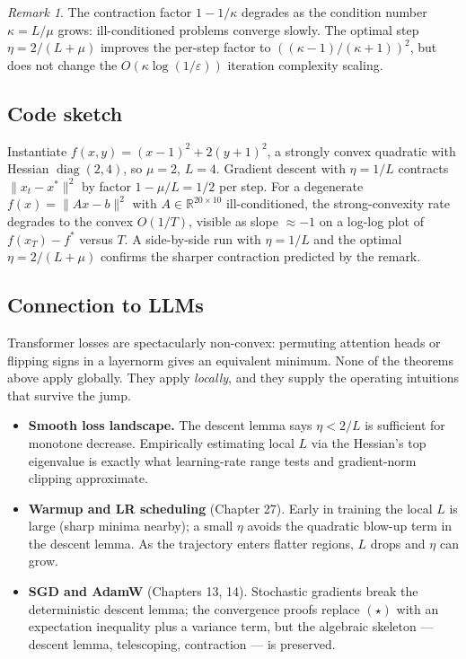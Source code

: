 \documentclass[11pt]{article}
\theoremstyle{remark}
\newtheorem{remark}[theorem]{Remark}
\begin{document}
\begin{remark}
The contraction factor $1 - 1/\kappa$ degrades as the condition number $\kappa = L/\mu$ grows: ill-conditioned problems converge slowly. The optimal step $\eta = 2/(L + \mu)$ improves the per-step factor to $((\kappa - 1)/(\kappa + 1))^2$, but does not change the $O(\kappa \log(1/\varepsilon))$ iteration complexity scaling.
\end{remark}

\subsection*{Code sketch}

Instantiate $f(x, y) = (x-1)^2 + 2(y+1)^2$, a strongly convex quadratic with Hessian $\operatorname{diag}(2, 4)$, so $\mu = 2$, $L = 4$. Gradient descent with $\eta = 1/L$ contracts $\|x_t - x^*\|^2$ by factor $1 - \mu/L = 1/2$ per step. For a degenerate $f(x) = \|Ax - b\|^2$ with $A \in \mathbb{R}^{20 \times 10}$ ill-conditioned, the strong-convexity rate degrades to the convex $O(1/T)$, visible as slope $\approx -1$ on a log-log plot of $f(x_T) - f^*$ versus $T$. A side-by-side run with $\eta = 1/L$ and the optimal $\eta = 2/(L + \mu)$ confirms the sharper contraction predicted by the remark.

\subsection*{Connection to LLMs}

Transformer losses are spectacularly non-convex: permuting attention heads or flipping signs in a layernorm gives an equivalent minimum. None of the theorems above apply globally. They apply \emph{locally}, and they supply the operating intuitions that survive the jump.

\begin{itemize}
\item \textbf{Smooth loss landscape.} The descent lemma says $\eta < 2/L$ is sufficient for monotone decrease. Empirically estimating local $L$ via the Hessian's top eigenvalue is exactly what learning-rate range tests and gradient-norm clipping approximate.
\item \textbf{Warmup and LR scheduling} (Chapter 27). Early in training the local $L$ is large (sharp minima nearby); a small $\eta$ avoids the quadratic blow-up term in the descent lemma. As the trajectory enters flatter regions, $L$ drops and $\eta$ can grow.
\item \textbf{SGD and AdamW} (Chapters 13, 14). Stochastic gradients break the deterministic descent lemma; the convergence proofs replace $(\star)$ with an expectation inequality plus a variance term, but the algebraic skeleton --- descent lemma, telescoping, contraction --- is preserved.
\end{itemize}
\end{document}
